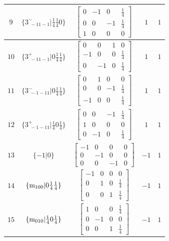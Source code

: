 \documentclass[fleqn,8pt]{jsarticle}
\begin{document}
\begin{longtable}{ccccc}
$ 9 $ & $ \{3^{-}_{\,\,-11-1}|\frac{1}{4} \frac{1}{4} 0\} $ & $ \begin{bmatrix} 0 & -1 & 0 & \frac{1}{4} \\ 0 & 0 & -1 & \frac{1}{4} \\ 1 & 0 & 0 & 0 \end{bmatrix} $ & $ 1 $ & $ 1 $ \\ \hline
$ 10 $ & $ \{3^{+}_{\,\,-11-1}|0 \frac{1}{4} \frac{1}{4}\} $ & $ \begin{bmatrix} 0 & 0 & 1 & 0 \\ -1 & 0 & 0 & \frac{1}{4} \\ 0 & -1 & 0 & \frac{1}{4} \end{bmatrix} $ & $ 1 $ & $ 1 $ \\ \hline
$ 11 $ & $ \{3^{-}_{\,\,-1-11}|0 \frac{1}{4} \frac{1}{4}\} $ & $ \begin{bmatrix} 0 & 1 & 0 & 0 \\ 0 & 0 & -1 & \frac{1}{4} \\ -1 & 0 & 0 & \frac{1}{4} \end{bmatrix} $ & $ 1 $ & $ 1 $ \\ \hline
$ 12 $ & $ \{3^{+}_{\,\,-1-11}|\frac{1}{4} 0 \frac{1}{4}\} $ & $ \begin{bmatrix} 0 & 0 & -1 & \frac{1}{4} \\ 1 & 0 & 0 & 0 \\ 0 & -1 & 0 & \frac{1}{4} \end{bmatrix} $ & $ 1 $ & $ 1 $ \\ \hline
$ 13 $ & $ \{-1|0\} $ & $ \begin{bmatrix} -1 & 0 & 0 & 0 \\ 0 & -1 & 0 & 0 \\ 0 & 0 & -1 & 0 \end{bmatrix} $ & $ -1 $ & $ 1 $ \\ \hline
$ 14 $ & $ \{{\rm m}_{100}|0 \frac{1}{4} \frac{1}{4}\} $ & $ \begin{bmatrix} -1 & 0 & 0 & 0 \\ 0 & 1 & 0 & \frac{1}{4} \\ 0 & 0 & 1 & \frac{1}{4} \end{bmatrix} $ & $ -1 $ & $ 1 $ \\ \hline
$ 15 $ & $ \{{\rm m}_{010}|\frac{1}{4} 0 \frac{1}{4}\} $ & $ \begin{bmatrix} 1 & 0 & 0 & \frac{1}{4} \\ 0 & -1 & 0 & 0 \\ 0 & 0 & 1 & \frac{1}{4} \end{bmatrix} $ & $ -1 $ & $ 1 $ \\ \hline

\end{longtable}
\end{document}
